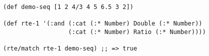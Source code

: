 \begin{lstlisting}[style=reclojureClojure,frame=single]
(def demo-seq [1 2 4/3 4 5 6.5 3 2])

(def rte-1 '(:and (:cat (:* Number) Double (:* Number))
                  (:cat (:* Number) Ratio (:* Number))))

(rte/match rte-1 demo-seq) ;; => true
\end{lstlisting}
